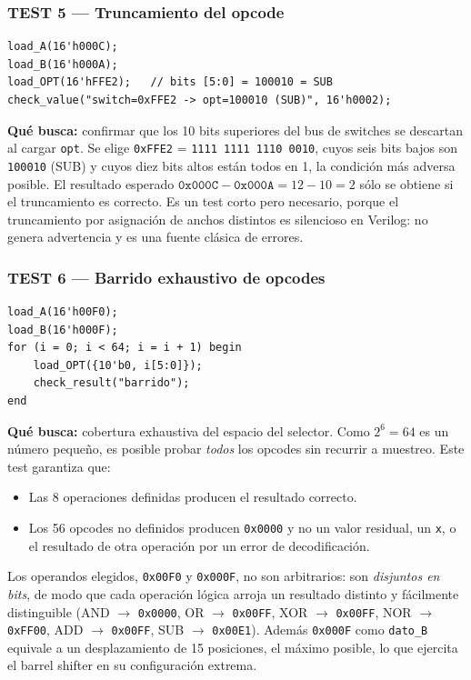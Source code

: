 \documentclass[12pt,a4paper]{article}
\begin{document}
\subsubsection{TEST 5 --- Truncamiento del opcode}

\begin{lstlisting}
load_A(16'h000C);
load_B(16'h000A);
load_OPT(16'hFFE2);   // bits [5:0] = 100010 = SUB
check_value("switch=0xFFE2 -> opt=100010 (SUB)", 16'h0002);
\end{lstlisting}

\textbf{Qué busca:} confirmar que los 10 bits superiores del bus de switches se
descartan al cargar \texttt{opt}. Se elige \texttt{0xFFE2} = \texttt{1111 1111
1110 0010}, cuyos seis bits bajos son \texttt{100010} (SUB) y cuyos diez bits
altos están todos en 1, la condición más adversa posible. El resultado esperado
$\texttt{0x000C} - \texttt{0x000A} = 12 - 10 = 2$ sólo se obtiene si el
truncamiento es correcto. Es un test corto pero necesario, porque el
truncamiento por asignación de anchos distintos es silencioso en Verilog: no
genera advertencia y es una fuente clásica de errores.

\subsubsection{TEST 6 --- Barrido exhaustivo de opcodes}

\begin{lstlisting}
load_A(16'h00F0);
load_B(16'h000F);
for (i = 0; i < 64; i = i + 1) begin
    load_OPT({10'b0, i[5:0]});
    check_result("barrido");
end
\end{lstlisting}

\textbf{Qué busca:} cobertura exhaustiva del espacio del selector. Como
$2^6 = 64$ es un número pequeño, es posible probar \emph{todos} los opcodes sin
recurrir a muestreo. Este test garantiza que:

\begin{itemize}[leftmargin=2em,itemsep=0.15em]
  \item Las 8 operaciones definidas producen el resultado correcto.
  \item Los 56 opcodes no definidos producen \texttt{0x0000} y no un valor
        residual, un \texttt{x}, o el resultado de otra operación por un error
        de decodificación.
\end{itemize}

Los operandos elegidos, \texttt{0x00F0} y \texttt{0x000F}, no son arbitrarios:
son \emph{disjuntos en bits}, de modo que cada operación lógica arroja un
resultado distinto y fácilmente distinguible (AND $\to$ \texttt{0x0000}, OR
$\to$ \texttt{0x00FF}, XOR $\to$ \texttt{0x00FF}, NOR $\to$ \texttt{0xFF00},
ADD $\to$ \texttt{0x00FF}, SUB $\to$ \texttt{0x00E1}). Además \texttt{0x000F}
como \texttt{dato\_B} equivale a un desplazamiento de 15 posiciones, el máximo
posible, lo que ejercita el barrel shifter en su configuración extrema.
\end{document}

